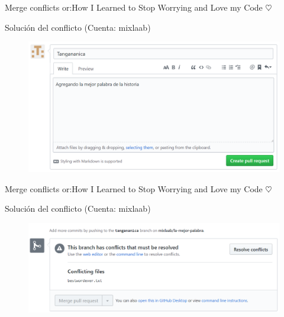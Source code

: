 \documentclass[10pt]{beamer}
\begin{document}
\begin{frame}{Merge conflicts or:}{How I Learned to Stop Worrying and Love my Code $\heartsuit$}

\begin{block}{Solución del conflicto (Cuenta: mixlaab)}

\begin{figure}[h!]
\centering
\includegraphics [scale=0.25]{conflict2}
\label{fig:issues}
\end{figure}
    
\end{block}

\end{frame}

\begin{frame}{Merge conflicts or:}{How I Learned to Stop Worrying and Love my Code $\heartsuit$}

\begin{block}{Solución del conflicto (Cuenta: mixlaab)}

\begin{figure}[h!]
\centering
\includegraphics [scale=0.25]{conflict3}
\label{fig:issues}
\end{figure}
    
\end{block}

\end{frame}
\end{document}
